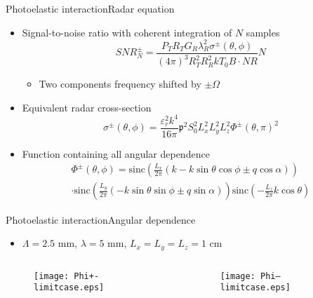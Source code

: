 \documentclass[11pt]{beamer}
\begin{document}
	\begin{frame}{Photoelastic interaction}{Radar equation}
		\pause
		\begin{itemize}
			\item Signal-to-noise ratio with coherent integration of $N$ samples
			\begin{equation*}
				\textit{SNR}^\pm_N = \frac{P_T R_T G_R \lambda_R^2 \sigma^\pm (\theta,\phi)}{(4\pi)^3 R_T^2 R_R^2 kT_0 B \cdot \mathit{NR}} N
			\end{equation*}
			\begin{itemize}
				\item Two components frequency shifted by $\pm \Omega$
			\end{itemize} \pause
			\item Equivalent radar cross-section
			\begin{equation*}
				\sigma^\pm (\theta, \phi) = \frac{\varepsilon_r^2 k^4}{16\pi} \mathfrak{p}^2 S_0^2 L_x^2 L_y^2 L_z^2 \Phi^\pm (\theta,\pi)^2
			\end{equation*} \pause
			\item Function containing all angular dependence
			\begin{multline*}
				\Phi^\pm(\theta,\phi) = \text{sinc} \left( \frac{L_x}{2\pi} \left( k - k\sin{\theta}\cos{\phi} \pm q\cos{\alpha} \right) \right) \\
				\cdot \text{sinc} \left( \frac{L_y}{2\pi} \left( -k\sin{\theta}\sin{\phi} \pm q\sin{\alpha} \right) \right) 
				\text{sinc} \left( -\frac{L_z}{2\pi} k\cos{\theta} \right)
			\end{multline*}
		\end{itemize}
	\end{frame}
	
	\begin{frame}{Photoelastic interaction}{Angular dependence}
		\begin{itemize}
			\item $\Lambda = 2.5$ mm, $\lambda = 5$ mm, $L_x = L_y = L_z = 1$ cm
		\end{itemize}
		\begin{columns}
			\begin{column}{0.5\textwidth}
				\begin{figure}
					\centering
					\texttt{[image: Phi+-limitcase.eps]}
				\end{figure}
			\end{column}
			\begin{column}{0.5\textwidth}
				\begin{figure}
					\centering
					\texttt{[image: Phi--limitcase.eps]}
				\end{figure}
			\end{column}
		\end{columns}
	\end{frame}
	
\end{document}
